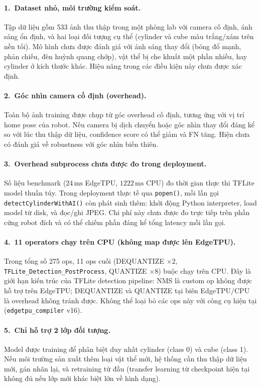 \paragraph{1.~Dataset nhỏ, môi trường kiểm soát.}
Tập dữ liệu gồm 533 ảnh thu thập trong một phòng lab với camera
cố định, ánh sáng ổn định, và hai loại đối tượng cụ thể
(cylinder và cube màu trắng/xám trên nền tối). Mô hình chưa được
đánh giá với ánh sáng thay đổi (bóng đổ mạnh, phản chiếu, đèn
huỳnh quang chớp), vật thể bị che khuất một phần nhiều, hay
cylinder ở kích thước khác. Hiệu năng trong các điều kiện này
chưa được xác định.

\paragraph{2.~Góc nhìn camera cố định (overhead).}
Toàn bộ ảnh training được chụp từ góc overhead cố định, tương
ứng với vị trí home pose của robot. Nếu camera bị dịch chuyển
hoặc góc nhìn thay đổi đáng kể so với lúc thu thập dữ liệu,
confidence score có thể giảm và FN tăng. Hiện chưa có đánh giá
về robustness với góc nhìn biến thiên.

\paragraph{3.~Overhead subprocess chưa được đo trong deployment.}
Số liệu benchmark ($24\,\text{ms}$ EdgeTPU, $1222\,\text{ms}$
CPU) đo thời gian thực thi TFLite model thuần túy. Trong deployment
thực tế qua \texttt{popen()}, mỗi lần gọi \texttt{detectCylinderWithAI()}
còn phát sinh thêm: khởi động Python interpreter, load model từ
disk, và đọc/ghi JPEG. Chi phí này chưa được đo trực tiếp trên
phần cứng robot đích và có thể chiếm phần đáng kể tổng latency
mỗi lần gọi.

\paragraph{4.~11 operators chạy trên CPU (không map được lên EdgeTPU).}
Trong tổng số 275 ops, 11 ops cuối (DEQUANTIZE $\times 2$,
\texttt{TFLite\_Detection\_PostProcess}, QUANTIZE $\times 8$)
buộc chạy trên CPU. Đây là giới hạn kiến trúc của TFLite
detection pipeline: NMS là custom op không được hỗ trợ trên
EdgeTPU; DEQUANTIZE và QUANTIZE tại biên EdgeTPU/CPU là overhead
không tránh được. Không thể loại bỏ các ops này với công cụ
hiện tại (\texttt{edgetpu\_compiler} v16).

\paragraph{5.~Chỉ hỗ trợ 2 lớp đối tượng.}
Model được training để phân biệt duy nhất cylinder (class 0)
và cube (class 1). Nếu môi trường sản xuất thêm loại vật thể
mới, hệ thống cần thu thập dữ liệu mới, gán nhãn lại, và
retraining từ đầu (transfer learning từ checkpoint hiện tại
không đủ nếu lớp mới khác biệt lớn về hình dạng).

